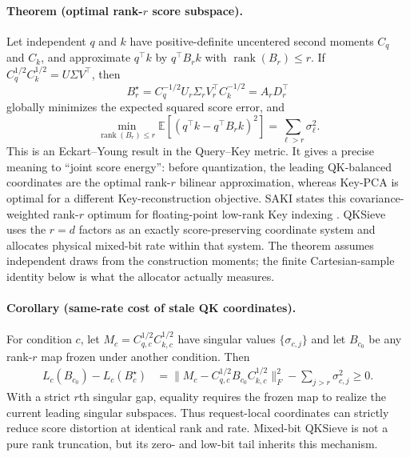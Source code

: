 \paragraph{Theorem (optimal rank-$r$ score subspace).}
Let independent $q$ and $k$ have positive-definite uncentered second moments
$C_q$ and $C_k$, and approximate $q^\top k$ by $q^\top B_r k$ with
$\operatorname{rank}(B_r)\le r$.  If
$C_q^{1/2}C_k^{1/2}=U\Sigma V^\top$, then
\begin{equation}
 B_r^\star=C_q^{-1/2}U_r\Sigma_rV_r^\top C_k^{-1/2}
 =A_rD_r^\top
 \label{eq:optimal-rank-score-map}
\end{equation}
globally minimizes the expected squared score error, and
\begin{equation}
 \min_{\operatorname{rank}(B_r)\le r}
 \mathbb E[(q^\top k-q^\top B_rk)^2]
 =\sum_{\ell>r}\sigma_\ell^2.
 \label{eq:optimal-rank-score-error}
\end{equation}
This is an Eckart--Young result in the Query--Key metric.  It gives a precise
meaning to ``joint score energy'': before quantization, the leading
QK-balanced coordinates are the optimal rank-$r$ bilinear approximation,
whereas Key-PCA is optimal for a different Key-reconstruction objective.
SAKI states this covariance-weighted rank-$r$ optimum for floating-point
low-rank Key indexing \citep{zhang2026saki}.  QKSieve uses the $r=d$ factors
as an exactly score-preserving coordinate system and allocates physical
mixed-bit rate within that system.
The theorem assumes independent draws from the construction moments; the
finite Cartesian-sample identity below is what the allocator actually
measures.

\paragraph{Corollary (same-rate cost of stale QK coordinates).}
For condition $c$, let
$M_c=C_{q,c}^{1/2}C_{k,c}^{1/2}$ have singular values
$\{\sigma_{c,j}\}$ and let $B_{c_0}$ be any rank-$r$ map frozen under
another condition.  Then
\begin{align}
 L_c(B_{c_0})-L_c(B_c^\star)
 &=
 \|M_c-C_{q,c}^{1/2}B_{c_0}C_{k,c}^{1/2}\|_F^2
 -\sum_{j>r}\sigma_{c,j}^2
 \geq0 .
 \label{eq:stale-qk-coordinate-excess}
\end{align}
With a strict $r$th singular gap, equality requires the frozen map to
realize the current leading singular subspaces.  Thus request-local
coordinates can strictly reduce score distortion at identical rank and
rate.  Mixed-bit QKSieve is not a pure rank truncation, but its zero- and
low-bit tail inherits this mechanism.

